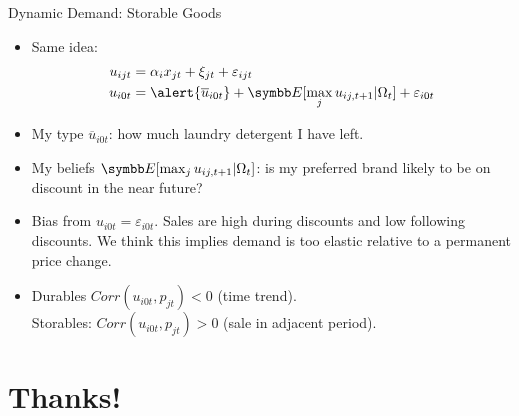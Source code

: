 \documentclass[aspectratio=169,11pt]{beamer}
\begin{document}
\begin{frame}{Dynamic Demand: Storable Goods}
\begin{itemize}
\item Same idea:
\begin{align*}
u_{ijt} &=   \alpha_i x_{jt}  +  \xi_{jt} + \varepsilon_{ijt}\\
u_{i0t} &=  \alert{\overline{u}_{i0t}} + \E[\max_j u_{ij,t+1}| \Omega_t] + \varepsilon_{i0t} 
\end{align*}
\item My type $\overline{u}_{i0t}$: how much laundry detergent I have left.

\item My beliefs $\E[\max_j u_{ij,t+1}| \Omega_t]$: is my preferred brand likely to be on discount in the near future?
\item Bias from $u_{i0t} = \varepsilon_{i0t}$. Sales are high during discounts and low following discounts. We think this implies demand is \alert{too elastic} relative to a permanent price change.
\item Durables $Corr(u_{i0t},p_{jt}) <0$ (time trend).\\
 Storables: $Corr(u_{i0t},p_{jt}) > 0 $ (sale in adjacent period).
\end{itemize}
\end{frame}

\section*{Thanks!}
\end{document}

